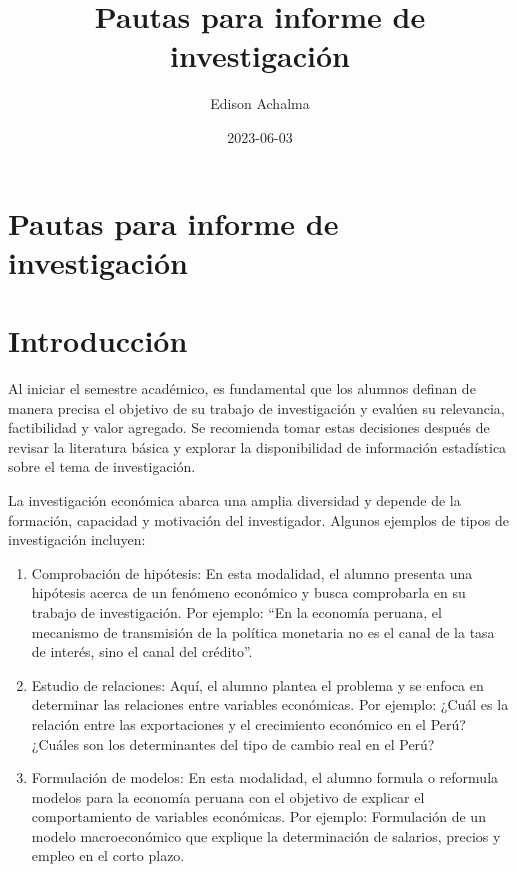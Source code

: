 \documentclass[
  jou,
  floatsintext,
  longtable,
  a4paper,
  nolmodern,
  notxfonts,
  notimes,
  12pt,
  colorlinks=true,linkcolor=blue,citecolor=blue,urlcolor=blue]{apa7}
\title{Pautas para informe de investigación}
\author{Edison Achalma}
\affiliation{
{Escuela Profesional de Economía, Universidad Nacional de San Cristóbal
de Huamanga}}
\date{2023-06-03}
\begin{document}
\maketitle


\hypertarget{toc}{}
\tableofcontents
\newpage
\section[Introduction]{Pautas para informe de investigación}

\setcounter{secnumdepth}{3}

\setlength\LTleft{0pt}




\section{Introducción}\label{introducciuxf3n}

Al iniciar el semestre académico, es fundamental que los alumnos definan
de manera precisa el objetivo de su trabajo de investigación y evalúen
su relevancia, factibilidad y valor agregado. Se recomienda tomar estas
decisiones después de revisar la literatura básica y explorar la
disponibilidad de información estadística sobre el tema de
investigación.

La investigación económica abarca una amplia diversidad y depende de la
formación, capacidad y motivación del investigador. Algunos ejemplos de
tipos de investigación incluyen:

\begin{enumerate}
\def\labelenumi{\arabic{enumi}.}
\item
  Comprobación de hipótesis: En esta modalidad, el alumno presenta una
  hipótesis acerca de un fenómeno económico y busca comprobarla en su
  trabajo de investigación. Por ejemplo: ``En la economía peruana, el
  mecanismo de transmisión de la política monetaria no es el canal de la
  tasa de interés, sino el canal del crédito''.
\item
  Estudio de relaciones: Aquí, el alumno plantea el problema y se enfoca
  en determinar las relaciones entre variables económicas. Por ejemplo:
  ¿Cuál es la relación entre las exportaciones y el crecimiento
  económico en el Perú? ¿Cuáles son los determinantes del tipo de cambio
  real en el Perú?
\item
  Formulación de modelos: En esta modalidad, el alumno formula o
  reformula modelos para la economía peruana con el objetivo de explicar
  el comportamiento de variables económicas. Por ejemplo: Formulación de
  un modelo macroeconómico que explique la determinación de salarios,
  precios y empleo en el corto plazo.
\end{enumerate}
\end{document}
